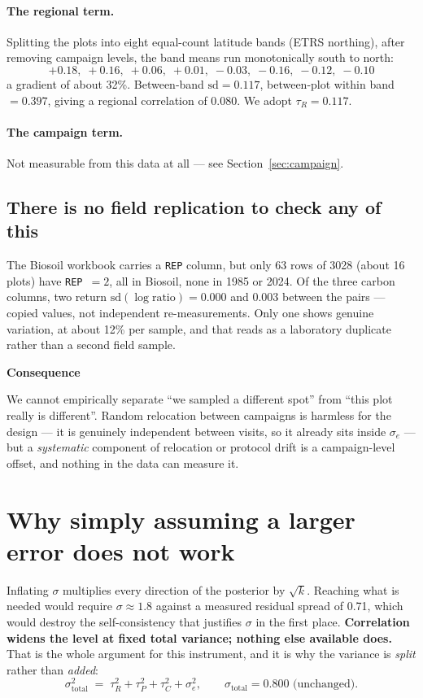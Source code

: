 \documentclass[11pt]{article}
\newenvironment{warnbox}[1][]{%
  \begin{leftbar}\noindent\textcolor{red!60!black}{\textbf{\small #1}}\par\vspace{0.3em}\small}{\end{leftbar}}
\begin{document}
\paragraph{The regional term.} Splitting the plots into eight equal-count latitude
bands (ETRS northing), after removing campaign levels, the band means run
monotonically south to north:
\[
+0.18,\;+0.16,\;+0.06,\;+0.01,\;-0.03,\;-0.16,\;-0.12,\;-0.10
\]
a gradient of about 32\%. Between-band $\mathrm{sd} = \mathbf{0.117}$, between-plot
within band $=0.397$, giving a regional correlation of 0.080. We adopt
$\tau_R = 0.117$.

\paragraph{The campaign term.} Not measurable from this data at all --- see
Section~\ref{sec:campaign}.

\subsection{There is no field replication to check any of this}

The Biosoil workbook carries a \texttt{REP} column, but only 63 rows of 3028 (about
16 plots) have \texttt{REP}~$=2$, all in Biosoil, none in 1985 or 2024. Of the three
carbon columns, two return $\mathrm{sd}(\log\text{ratio}) = 0.000$ and $0.003$
between the pairs --- copied values, not independent re-measurements. Only one shows
genuine variation, at about 12\% per sample, and that reads as a laboratory
duplicate rather than a second field sample.

\begin{warnbox}[Consequence]
We cannot empirically separate ``we sampled a different spot'' from ``this plot
really is different''. Random relocation between campaigns is harmless for the
design --- it is genuinely independent between visits, so it already sits inside
$\sigma_e$ --- but a \emph{systematic} component of relocation or protocol drift is
a campaign-level offset, and nothing in the data can measure it.
\end{warnbox}

\section{Why simply assuming a larger error does not work}

Inflating $\sigma$ multiplies every direction of the posterior by $\sqrt{k}$.
Reaching what is needed would require $\sigma \approx 1.8$ against a measured
residual spread of 0.71, which would destroy the self-consistency that justifies
$\sigma$ in the first place. \textbf{Correlation widens the level at fixed total
variance; nothing else available does.} That is the whole argument for this
instrument, and it is why the variance is \emph{split} rather than \emph{added}:
\[
\sigma^2_{\text{total}} \;=\; \tau_R^2 + \tau_P^2 + \tau_C^2 + \sigma_e^2 ,
\qquad \sigma_{\text{total}} = 0.800 \text{ (unchanged)} .
\]
\end{document}
